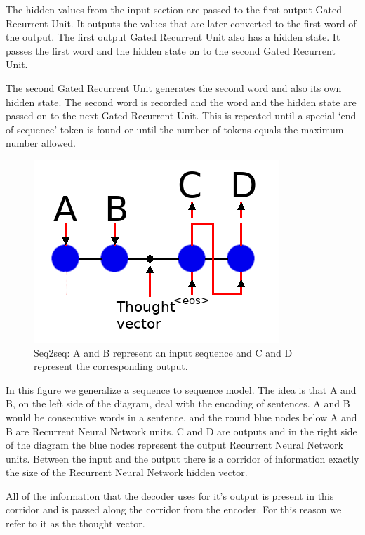 The hidden values from the input section are passed to the first output Gated Recurrent Unit. It outputs the values that are later converted to the first word of the output. The first output Gated Recurrent Unit also has a hidden state. It passes the first word and the hidden state on to the second Gated Recurrent Unit.

The second Gated Recurrent Unit generates the second word and also its own hidden state. The second word is recorded and the word and the hidden state are passed on to the next Gated Recurrent Unit. This is repeated until a special `end-of-sequence' token is found or until the number of tokens equals the maximum number allowed.

\begin{figure}[H]
	\begin{center}
	
	\includegraphics[scale=0.5]{diagram-nmt}
		
\end{center}
	\caption[Sequence to Sequence Architecture]{Seq2seq: A and B represent an input sequence and C and D represent the corresponding output.}
	

\end{figure}

In this figure we generalize a sequence to sequence model. The idea is that A and B, on the left side of the diagram, deal with the encoding of sentences. A and B would be consecutive words in a sentence, and the round blue nodes below A and B are Recurrent Neural Network units. C and D are outputs and in the right side of the diagram the blue nodes represent the output Recurrent Neural Network units. Between the input and the output there is a corridor of information exactly the size of the Recurrent Neural Network hidden vector. 

All of the information that the decoder uses for it\textquoteright s output is present in this corridor and is passed along the corridor from the encoder. For this reason we refer to it as the thought vector.

